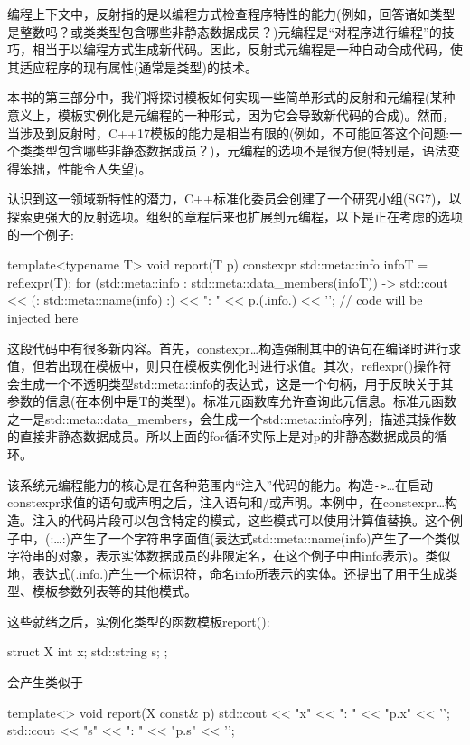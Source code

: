 编程上下文中，反射指的是以编程方式检查程序特性的能力(例如，回答诸如类型是整数吗？或类类型包含哪些非静态数据成员？)元编程是“对程序进行编程”的技巧，相当于以编程方式生成新代码。因此，反射式元编程是一种自动合成代码，使其适应程序的现有属性(通常是类型)的技术。

本书的第三部分中，我们将探讨模板如何实现一些简单形式的反射和元编程(某种意义上，模板实例化是元编程的一种形式，因为它会导致新代码的合成)。然而，当涉及到反射时，C++17模板的能力是相当有限的(例如，不可能回答这个问题:一个类类型包含哪些非静态数据成员？)，元编程的选项不是很方便(特别是，语法变得笨拙，性能令人失望)。

认识到这一领域新特性的潜力，C++标准化委员会创建了一个研究小组(SG7)，以探索更强大的反射选项。组织的章程后来也扩展到元编程，以下是正在考虑的选项的一个例子:

\begin{cpp}
template<typename T> void report(T p) {
	constexpr {
		std::meta::info infoT = reflexpr(T);
		for (std::meta::info : std::meta::data_members(infoT)) {
			-> {
				std::cout << (: std::meta::name(info) :)
				<< ": " << p.(.info.) << ’\n’;
			}
		}
	}
	// code will be injected here
}
\end{cpp}

这段代码中有很多新内容。首先，constexpr{…}构造强制其中的语句在编译时进行求值，但若出现在模板中，则只在模板实例化时进行求值。其次，reflexpr()操作符会生成一个不透明类型std::meta::info的表达式，这是一个句柄，用于反映关于其参数的信息(在本例中是T的类型)。标准元函数库允许查询此元信息。标准元函数之一是std::meta::data\_members，会生成一个std::meta::info序列，描述其操作数的直接非静态数据成员。所以上面的for循环实际上是对p的非静态数据成员的循环。

该系统元编程能力的核心是在各种范围内“注入”代码的能力。构造\texttt{->}{…}在启动constexpr求值的语句或声明之后，注入语句和/或声明。本例中，在constexpr{…}构造。注入的代码片段可以包含特定的模式，这些模式可以使用计算值替换。这个例子中，(:…:)产生了一个字符串字面值(表达式std::meta::name(info)产生了一个类似字符串的对象，表示实体数据成员的非限定名，在这个例子中由info表示)。类似地，表达式(.info.)产生一个标识符，命名info所表示的实体。还提出了用于生成类型、模板参数列表等的其他模式。

这些就绪之后，实例化类型的函数模板report():

\begin{cpp}
struct X {
	int x;
	std::string s;
};
\end{cpp}

会产生类似于

\begin{cpp}
template<> void report(X const& p) {
	std::cout << "x" << ": " << "p.x" << ’\n’;
	std::cout << "s" << ": " << "p.s" << ’\n’;
}
\end{cpp}

